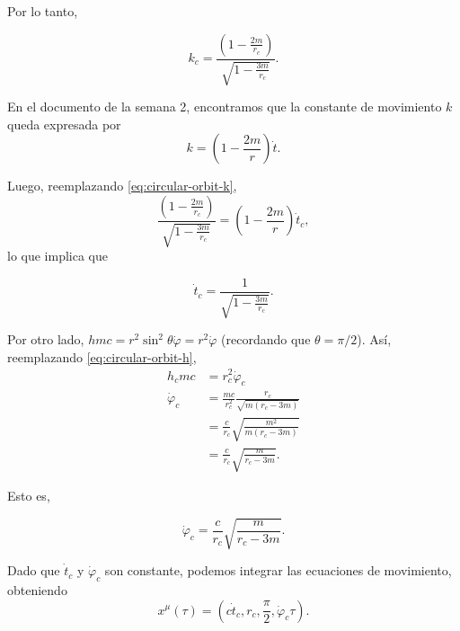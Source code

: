 \documentclass[letterpaper,11pt]{article}
\begin{document}
Por lo tanto,
\begin{shaded}
\begin{equation} \label{eq:circular-orbit-k}
k_c = \frac{\left( 1 - \frac{2m}{r_c}\right)}{\sqrt{ 1 - \frac{3m}{r_c}}}.
\end{equation}
\end{shaded}

En el documento de la semana 2, encontramos que la constante de movimiento $k$ queda expresada por
\begin{equation}
k = \left( 1 -  \frac{2m}{r}\right) \dot{t}.
\end{equation}

Luego, reemplazando \eqref{eq:circular-orbit-k}, 
\begin{equation}
\frac{\left( 1 - \frac{2m}{r_c}\right)}{\sqrt{ 1 - \frac{3m}{r_c}}} =  \left( 1 -  \frac{2m}{r}\right) \dot{t}_c,
\end{equation}
lo que implica que
\begin{shaded}
\begin{equation} \label{eq:circular-orbit-t}
\dot{t}_c = \frac{1}{\sqrt{1 - \frac{3m}{r_c}}}.
\end{equation}
\end{shaded}

Por otro lado, $hmc = r^2 \sin^2\theta \dot{\varphi} = r^2 \dot{\varphi}$ (recordando que $\theta = \pi/2$). Así, reemplazando \eqref{eq:circular-orbit-h},
\begin{align}
h_c m c &= r_c^2 \dot{\varphi}_c \\
\dot{\varphi}_c &= \frac{mc}{r_c^2} \frac{r_c}{\sqrt{m(r_c - 3m)}} \\
&= \frac{c}{r_c} \sqrt{\frac{m^2}{m(r_c - 3m)}} \\
&= \frac{c}{r_c} \sqrt{\frac{m}{r_c-3m}}.
\end{align}

Esto es,
\begin{shaded}
\begin{equation} \label{eq:circular-orbit-phi}
\dot{\varphi}_c = \frac{c}{r_c} \sqrt{\frac{m}{r_c-3m}}.
\end{equation}
\end{shaded}

Dado que $\dot{t}_c$ y $\dot{\varphi}_c$ son constante, podemos integrar las ecuaciones de movimiento, obteniendo
\begin{equation}
x^{\mu}(\tau) = \left( c\dot{t}_c, r_c, \frac{\pi}{2},\dot{\varphi}_c \tau \right).
\end{equation}
\end{document}
